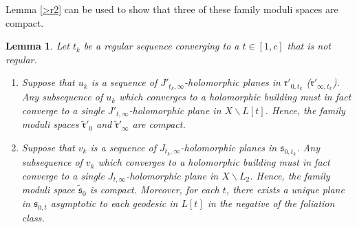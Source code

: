 \documentclass[12pt]{amsart}
\newtheorem{lemma}[theorem]{Lemma}
\theoremstyle{definition}
\begin{document}

Lemma \ref{>r2} can be used to show that three of these family moduli spaces are compact.




\begin{lemma}\label{lem:fam2} Let $t_k$ be a regular sequence converging to a $t \in [1,c]$ that is not regular.

\begin{enumerate}

\item %
Suppose that $u_k$ is a sequence of $J'_{t_k, \infty}$-holomorphic planes in $\mathfrak{r}'_{0,t_k}$ ($\mathfrak{r}'_{\infty,t_k}$). Any subsequence of $u_k$ which converges to a holomorphic building must in fact converge to a single  $J'_{t, \infty}$-holomorphic plane in $X \smallsetminus L[t]$. Hence, the family moduli spaces $\tilde {\mathfrak{r}}'_0$ and $\tilde {\mathfrak{r}}'_{\infty}$ are compact.  %

\item %
Suppose that $v_k$ is a sequence of $J_{t_k, \infty}$-holomorphic planes in $\mathfrak{s}_{0,t_k}$. Any subsequence of $v_k$ which converges to a holomorphic building must in fact converge to a single  $J_{t, \infty}$-holomorphic plane in $X \smallsetminus L_2$.
Hence, the family moduli space $\tilde {\mathfrak{s}}_0$ is compact.
Moreover, for each $t$, there exists a unique plane in $\mathfrak{s}_{0,t}$ asymptotic to each geodesic in $L[t]$ in the negative  of the foliation class.
\end{enumerate}
\end{lemma}
\end{document}
